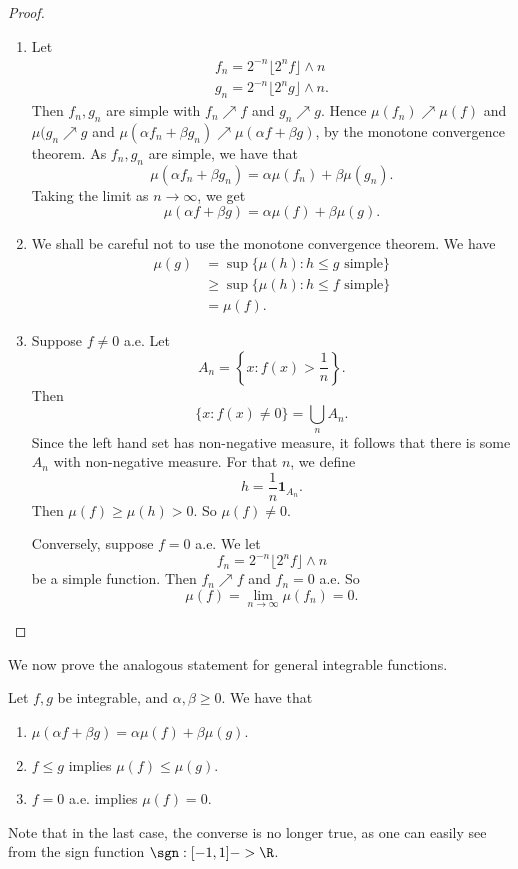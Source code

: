\documentclass[a4paper]{article}
\begin{document}
\begin{proof}\leavevmode
  \begin{enumerate}
    \item Let
      \begin{align*}
        f_n = 2^{-n}\lfloor 2^n f\rfloor \wedge n\\
        g_n = 2^{-n}\lfloor 2^n g\rfloor \wedge n.
      \end{align*}
      Then $f_n, g_n$ are simple with $f_n \nearrow f$ and $g_n \nearrow g$. Hence $\mu(f_n) \nearrow \mu(f)$ and $\mu(g_n \nearrow g$ and $\mu(\alpha f_n + \beta g_n) \nearrow \mu(\alpha f + \beta g)$, by the monotone convergence theorem. As $f_n, g_n$ are simple, we have that
      \[
        \mu(\alpha f_n + \beta g_n) = \alpha \mu(f_n) + \beta \mu(g_n).
      \]
      Taking the limit as $n \to \infty$, we get
      \[
        \mu(\alpha f + \beta g) = \alpha \mu(f) + \beta \mu(g).
      \]
    \item We shall be careful not to use the monotone convergence theorem. We have
      \begin{align*}
        \mu(g) &= \sup\{\mu(h): h \leq g\text{ simple}\}\\
        &\geq \sup \{\mu(h): h \leq f\text{ simple}\}\\
        &= \mu(f).
      \end{align*}
    \item Suppose $f \not= 0$ a.e. Let
      \[
        A_n = \left\{x: f(x) > \frac{1}{n}\right\}.
      \]
      Then
      \[
        \{x: f(x) \not= 0\} = \bigcup_n A_n.
      \]
      Since the left hand set has non-negative measure, it follows that there is some $A_n$ with non-negative measure. For that $n$, we define
      \[
        h = \frac{1}{n} \mathbf{1}_{A_n}.
      \]
      Then $\mu(f) \geq \mu(h) > 0$. So $\mu(f) \not= 0$.

      Conversely, suppose $f = 0$ a.e. We let
      \[
        f_n = 2^{-n} \lfloor 2^n f\rfloor \wedge n
      \]
      be a simple function. Then $f_n \nearrow f$ and $f_n = 0$ a.e. So
      \[
        \mu(f) = \lim_{n \to \infty}\mu(f_n) = 0.
      \]
  \end{enumerate}
\end{proof}

We now prove the analogous statement for general integrable functions.
\begin{thm}
  Let $f, g$ be integrable, and $\alpha, \beta \geq 0$. We have that
  \begin{enumerate}
    \item $\mu(\alpha f + \beta g) = \alpha \mu(f) + \beta \mu(g)$.
    \item $f \leq g$ implies $\mu(f) \leq \mu(g)$.
    \item $f = 0$ a.e. implies $\mu(f) = 0$.
  \end{enumerate}
\end{thm}
Note that in the last case, the converse is no longer true, as one can easily see from the sign function $\sgn: [-1, 1] -> \R$.
\end{document}
